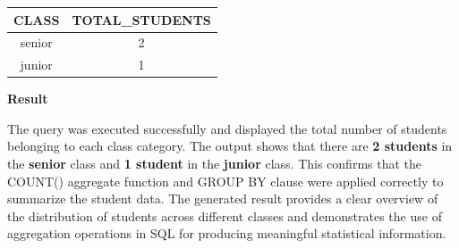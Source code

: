 \documentclass[12pt,a4paper]{report}
\begin{document}
\begin{center}
\renewcommand{\arraystretch}{1.6}
\begin{tabular}{|c|c|}
\hline
\textbf{CLASS} & \textbf{TOTAL\_STUDENTS} \\
\hline
senior & 2 \\
\hline
junior & 1 \\
\hline
\end{tabular}
\end{center}

\vspace{0.7cm}

\textbf{Result}

The query was executed successfully and displayed the total number of students belonging to each class category. The output shows that there are \textbf{2 students} in the \textbf{senior} class and \textbf{1 student} in the \textbf{junior} class. This confirms that the COUNT() aggregate function and GROUP BY clause were applied correctly to summarize the student data. The generated result provides a clear overview of the distribution of students across different classes and demonstrates the use of aggregation operations in SQL for producing meaningful statistical information.
\end{document}
